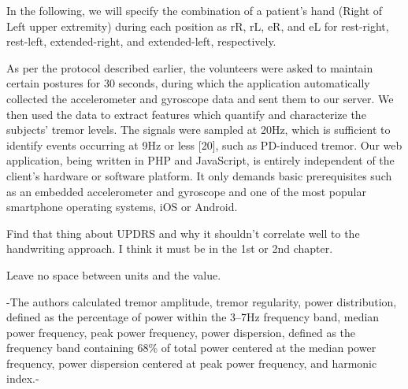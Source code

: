 In the following, we will specify the combination of a patient’s hand (Right of Left upper extremity) during each position as rR, rL, eR, and eL for rest-right, rest-left, extended-right, and extended-left, respectively.

As per the protocol described earlier, the volunteers were asked to maintain certain postures for 30 seconds, during which the application automatically collected the accelerometer and gyroscope data and sent them to our server. We then used the data to extract features which quantify and characterize the subjects’ tremor levels. The signals were sampled at 20Hz, which is sufficient to identify events occurring at 9Hz or less [20], such as PD-induced tremor. 
Our web application, being written in PHP and JavaScript, is entirely independent of the client's hardware or software platform. It only demands basic prerequisites such as an embedded accelerometer and gyroscope and one of the most popular smartphone operating systems, iOS or Android. 







Find that thing about UPDRS and why it shouldn't correlate well to the handwriting approach. I think it must be in the 1st or 2nd chapter.

Leave no space between units and the value. 




-The authors calculated tremor amplitude, tremor regularity, power distribution, defined as the percentage of power within the 3–7Hz frequency band, median power frequency, peak power frequency, power dispersion, defined as the frequency band containing 68\% of total power centered at the median power frequency, power dispersion centered at peak power frequency, and harmonic index.-

